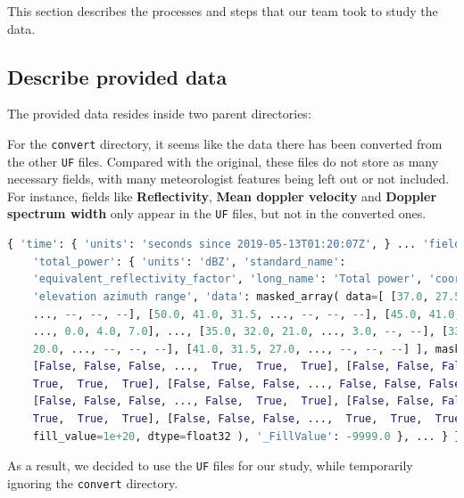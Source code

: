 This section describes the processes and steps that our team took to study the
data.

\subsection{Describe provided data}

The provided data resides inside two parent directories:



For the \texttt{convert} directory, it seems like the data there has been
converted from the other \texttt{UF} files. Compared with the original, these
files do not store as many necessary fields, with many meteorologist features
being left out or not included. For instance, fields like \textbf{Reflectivity},
\textbf{Mean doppler velocity} and \textbf{Doppler spectrum width} only appear
in the \texttt{UF} files, but not in the converted ones.

\begin{lstlisting}[language=python,caption={A sample of metadata extracted from UF file}]
{ 'time': { 'units': 'seconds since 2019-05-13T01:20:07Z', } ... 'fields': {
    'total_power': { 'units': 'dBZ', 'standard_name':
    'equivalent_reflectivity_factor', 'long_name': 'Total power', 'coordinates':
    'elevation azimuth range', 'data': masked_array( data=[ [37.0, 27.5, 37.5,
    ..., --, --, --], [50.0, 41.0, 31.5, ..., --, --, --], [45.0, 41.0, 29.5,
    ..., 0.0, 4.0, 7.0], ..., [35.0, 32.0, 21.0, ..., 3.0, --, --], [33.5, 27.5,
    20.0, ..., --, --, --], [41.0, 31.5, 27.0, ..., --, --, --] ], mask=[
    [False, False, False, ...,  True,  True,  True], [False, False, False, ...,
    True,  True,  True], [False, False, False, ..., False, False, False], ...,
    [False, False, False, ..., False,  True,  True], [False, False, False, ...,
    True,  True,  True], [False, False, False, ...,  True,  True,  True] ],
    fill_value=1e+20, dtype=float32 ), '_FillValue': -9999.0 }, ... } }
\end{lstlisting}


As a result, we decided to use the \texttt{UF} files for our study, while
temporarily ignoring the \texttt{convert} directory.


